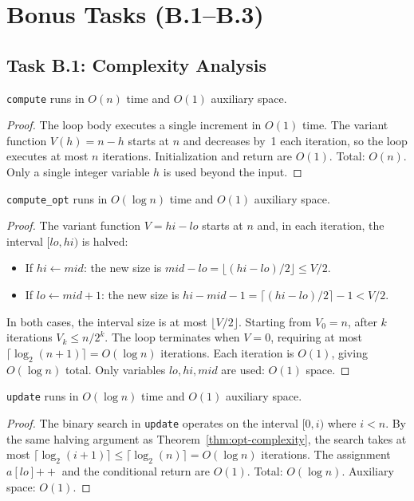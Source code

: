 \section{Bonus Tasks (B.1--B.3)}
\label{sec:bonus}

\subsection{Task B.1: Complexity Analysis}

\begin{theorem}\label{thm:compute-complexity}
\texttt{compute} runs in $O(n)$ time and $O(1)$ auxiliary space.
\end{theorem}
\begin{proof}
The loop body executes a single increment in $O(1)$ time.
The variant function $V(h) = n - h$ starts at $n$ and decreases by~1 each iteration,
so the loop executes at most $n$ iterations. Initialization and return are $O(1)$.
Total: $O(n)$. Only a single integer variable $h$ is used beyond the input.
\end{proof}

\begin{theorem}\label{thm:opt-complexity}
\texttt{compute\_opt} runs in $O(\log n)$ time and $O(1)$ auxiliary space.
\end{theorem}
\begin{proof}
The variant function $V = \mathit{hi} - \mathit{lo}$ starts at $n$ and, in each iteration,
the interval $[\mathit{lo}, \mathit{hi})$ is halved:
\begin{itemize}
  \item If $\mathit{hi} \gets \mathit{mid}$: the new size is
    $\mathit{mid} - \mathit{lo} = \lfloor(\mathit{hi} - \mathit{lo})/2\rfloor \leq V/2$.
  \item If $\mathit{lo} \gets \mathit{mid}+1$: the new size is
    $\mathit{hi} - \mathit{mid} - 1 = \lceil(\mathit{hi} - \mathit{lo})/2\rceil - 1 < V/2$.
\end{itemize}
In both cases, the interval size is at most $\lfloor V/2 \rfloor$.
Starting from $V_0 = n$, after $k$ iterations $V_k \leq n / 2^k$.
The loop terminates when $V = 0$, requiring at most
$\lceil\log_2(n+1)\rceil = O(\log n)$ iterations.
Each iteration is $O(1)$, giving $O(\log n)$ total.
Only variables $\mathit{lo}, \mathit{hi}, \mathit{mid}$ are used: $O(1)$ space.
\end{proof}

\begin{theorem}\label{thm:update-complexity}
\texttt{update} runs in $O(\log n)$ time and $O(1)$ auxiliary space.
\end{theorem}
\begin{proof}
The binary search in \texttt{update} operates on the interval $[0, i)$ where $i < n$.
By the same halving argument as Theorem~\ref{thm:opt-complexity}, the search takes
at most $\lceil\log_2(i+1)\rceil \leq \lceil\log_2(n)\rceil = O(\log n)$ iterations.
The assignment $a[\mathit{lo}]\mathrel{{+}{+}}$ and the conditional return are $O(1)$.
Total: $O(\log n)$. Auxiliary space: $O(1)$.
\end{proof}

